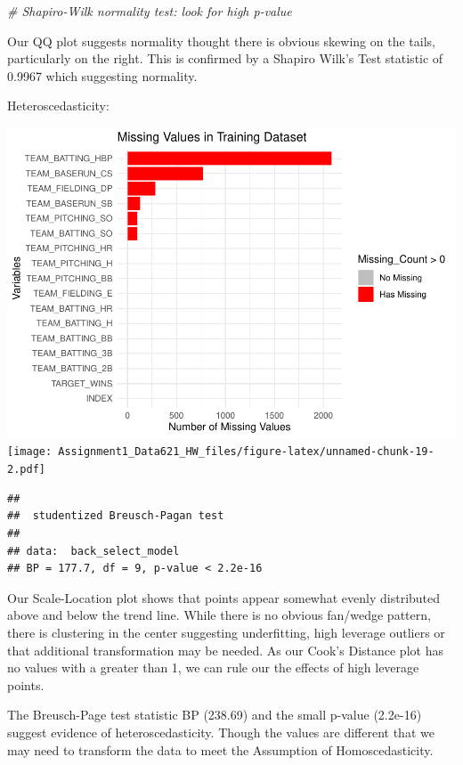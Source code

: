 \documentclass[
]{article}
\newenvironment{Shaded}{\begin{snugshade}}{\end{snugshade}}
\newcommand{\CommentTok}[1]{\textcolor[rgb]{0.56,0.35,0.01}{\textit{#1}}}
\begin{document}
\begin{Shaded}
\begin{Highlighting}[]
\CommentTok{\# Shapiro{-}Wilk normality test: look for high p{-}value}
\end{Highlighting}
\end{Shaded}

Our QQ plot suggests normality thought there is obvious skewing on the
tails, particularly on the right. This is confirmed by a Shapiro Wilk's
Test statistic of 0.9967 which suggesting normality.

Heteroscedasticity:

\includegraphics{Assignment1_Data621_HW_files/figure-latex/unnamed-chunk-19-1.pdf}
\texttt{[image: Assignment1\_Data621\_HW\_files/figure-latex/unnamed-chunk-19-2.pdf]}

\begin{verbatim}
## 
##  studentized Breusch-Pagan test
## 
## data:  back_select_model
## BP = 177.7, df = 9, p-value < 2.2e-16
\end{verbatim}

Our Scale-Location plot shows that points appear somewhat evenly
distributed above and below the trend line. While there is no obvious
fan/wedge pattern, there is clustering in the center suggesting
underfitting, high leverage outliers or that additional transformation
may be needed. As our Cook's Distance plot has no values with a greater
than 1, we can rule our the effects of high leverage points.

The Breusch-Page test statistic BP (238.69) and the small p-value
(2.2e-16) suggest evidence of heteroscedasticity. Though the values are
different that we may need to transform the data to meet the Assumption
of Homoscedasticity.
\end{document}
